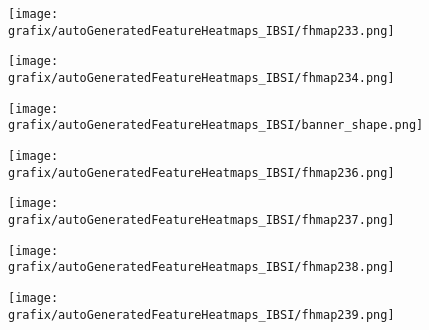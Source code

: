 \hspace{\hsp} 
\begin{subfigure}{\wid\textwidth} 
    \centering 
    \caption{\tiny \sffamily {}} 
    \vspace{\vsp} 
    \texttt{[image: grafix/autoGeneratedFeatureHeatmaps\_IBSI/fhmap233.png]} 
\end{subfigure} 
\hspace{\hsp} 
\begin{subfigure}{\wid\textwidth} 
    \centering 
    \caption{\tiny \sffamily {}} 
    \vspace{\vsp} 
    \texttt{[image: grafix/autoGeneratedFeatureHeatmaps\_IBSI/fhmap234.png]} 
\end{subfigure} 
\hspace{\hsp} 
\begin{subfigure}{\wid\textwidth} 
    \texttt{[image: grafix/autoGeneratedFeatureHeatmaps\_IBSI/banner\_shape.png]} 
\end{subfigure} 
\hspace{\hsp} 
\begin{subfigure}{\wid\textwidth} 
    \centering 
    \caption{\tiny \sffamily {}} 
    \vspace{\vsp} 
    \texttt{[image: grafix/autoGeneratedFeatureHeatmaps\_IBSI/fhmap236.png]} 
\end{subfigure} 
\hspace{\hsp} 
\begin{subfigure}{\wid\textwidth} 
    \centering 
    \caption{\tiny \sffamily {}} 
    \vspace{\vsp} 
    \texttt{[image: grafix/autoGeneratedFeatureHeatmaps\_IBSI/fhmap237.png]} 
\end{subfigure} 
\hspace{\hsp} 
\begin{subfigure}{\wid\textwidth} 
    \centering 
    \caption{\tiny \sffamily {}} 
    \vspace{\vsp} 
    \texttt{[image: grafix/autoGeneratedFeatureHeatmaps\_IBSI/fhmap238.png]} 
\end{subfigure} 
\hspace{\hsp} 
\begin{subfigure}{\wid\textwidth} 
    \centering 
    \caption{\tiny \sffamily {}} 
    \vspace{\vsp} 
    \texttt{[image: grafix/autoGeneratedFeatureHeatmaps\_IBSI/fhmap239.png]} 
\end{subfigure} 
